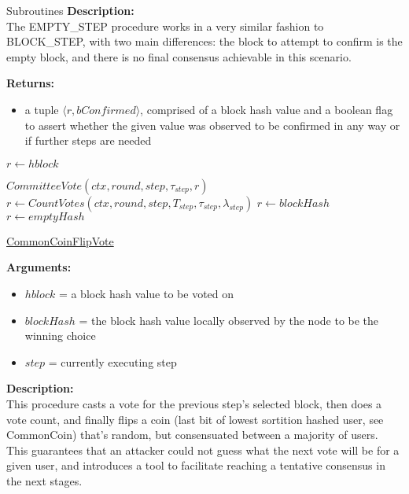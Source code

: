 \documentclass[10pt,a4paper]{article}
\begin{document}
\begin{section}{Subroutines}
\noindent \textbf{Description:}\\
The EMPTY\_STEP procedure works in a very similar fashion to BLOCK\_STEP, with two main differences: 
the block to attempt to confirm is the empty block, and there is no final consensus achievable in this scenario.

\noindent \textbf{Returns:}
\begin{itemize}
    \item a tuple $\langle r, bConfirmed \rangle$, comprised of a block hash value and a boolean flag to assert whether the given value was
    observed to be confirmed in any way or if further steps are needed
  \end{itemize}

\begin{algorithm}[H]
    \begin{algorithmic}[H]
        \State $r \gets hblock$
    
        \State $CommitteeVote(ctx, round, step, \tau_{step}, r)$
        \State $r \gets CountVotes(ctx,round,step,T_{step},\tau_{step},\lambda_{step})$
                \State $r \gets blockHash$
            \Else
                \State $r \gets emptyHash$
            \EndIf
        \EndIf
    \EndFunction
    \end{algorithmic}
    \caption{\underline{CommonCoinFlipVote}}
\end{algorithm}

\noindent \textbf{Arguments:}
\begin{itemize}
    \item $hblock$ = a block hash value to be voted on
    \item $blockHash$ = the block hash value locally observed by the node to be the winning choice
    \item $step$ = currently executing step
  \end{itemize}

\noindent \textbf{Description:}\\
This procedure casts a vote for the previous step's selected block, then does a vote count,
and finally flips a coin (last bit of lowest sortition hashed user, see CommonCoin) that's random,
but consensuated between a majority of users. This guarantees that an attacker could not guess what the
next vote will be for a given user, and introduces a tool to facilitate reaching a tentative consensus in the next stages.


\end{section}
\end{document}
